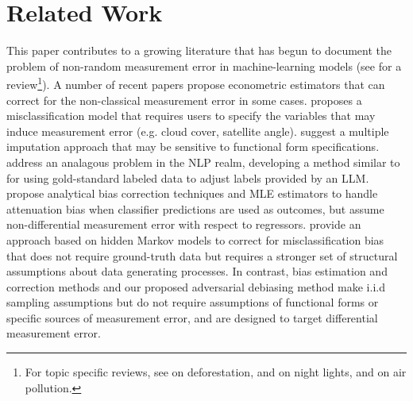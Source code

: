 \section{Related Work}
\label{litreview}
This paper contributes to a growing literature that has begun to document the problem of non-random measurement error in machine-learning models (see \cite{jain_benefits_2020} for a review\footnote{For topic specific reviews, see \cite{balboni_economics_2022} on deforestation, \cite{gibson_which_2021} and \cite{bluhm_what_2022} on night lights, and \cite{fowlie_bringing_2019} on air pollution.}). A number of recent papers propose econometric estimators that can correct for the non-classical measurement error in some cases. \citet{alix-garcia_remotely_2022} proposes a misclassification model that requires users to specify the variables that may induce measurement error (e.g. cloud cover, satellite angle). \citet{proctor_parameter_2023} suggest a multiple imputation approach that may be sensitive to functional form specifications. \citet{egami_using_2023} address an analagous problem in the NLP realm, developing a method similar to \cite{proctor_parameter_2023} for using gold-standard labeled data to adjust labels provided by an LLM. \citet{zhang_how_2021}
propose analytical bias correction techniques and MLE estimators to handle attenuation bias when classifier predictions are used as outcomes, but assume non-differential measurement error with respect to regressors. \citet{torchiana_improving_2023} provide an approach based on hidden Markov models to correct for misclassification bias that does not require ground-truth data but requires a stronger set of structural assumptions about data generating processes. In contrast, bias estimation and correction methods \citep[such as prediction-powered inference introduced in][]{angelopoulos_prediction-powered_2023} and our proposed adversarial debiasing method make i.i.d sampling assumptions but do not require assumptions of functional forms or specific sources of measurement error, and are designed to target differential measurement error.


%